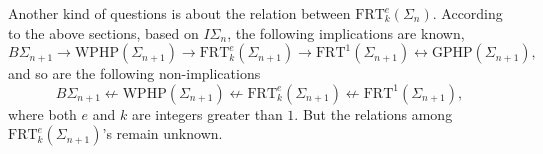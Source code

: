 \documentclass[twoside,a4paper]{amsart}
\theoremstyle{definition}
\theoremstyle{theorem}
\numberwithin{equation}{section}
\newcommand{\<}{\langle}
\renewcommand{\>}{\rangle}
\newcommand{\WPHP}{\mathrm{WPHP}}
\newcommand{\GPHP}{\mathrm{GPHP}}
\newcommand{\FRT}{\mathrm{FRT}}
\begin{document}
Another kind of questions is about the relation between $\FRT^e_k(\Sigma_n)$.
According to the above sections, based on $I\Sigma_n$, the following implications are known,
\[
  B\Sigma_{n+1} \to \WPHP(\Sigma_{n+1}) \to \FRT^e_k(\Sigma_{n+1}) \to 
   \FRT^1(\Sigma_{n+1}) \leftrightarrow \GPHP(\Sigma_{n+1}),
\]
and so are the following non-implications
\[
  B\Sigma_{n+1} \not\leftarrow \WPHP(\Sigma_{n+1}) \not\leftarrow \FRT^e_k(\Sigma_{n+1}) \not\leftarrow \FRT^1(\Sigma_{n+1}),
\]
where both $e$ and $k$ are integers greater than $1$.
But the relations among $\FRT^e_k(\Sigma_{n+1})$'s remain unknown.



\end{document}
